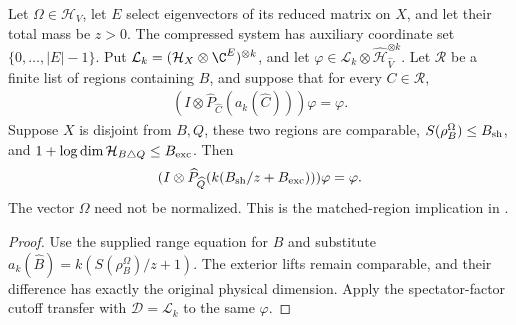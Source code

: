 \begin{theorem}
    \label{thm:compressed_physical_matched_cutoff}
    \leanok
    Let $\Omega\in\mathcal H_V$, let $E$ select eigenvectors of its
    reduced matrix on $X$, and let their total mass be $z>0$.
    The compressed system has auxiliary coordinate set $\{0,\ldots,|E|-1\}$.
    Put $\mathcal L_k=(\mathcal H_X\otimes\C^E)^{\otimes k}$, and let
    $\varphi\in\mathcal L_k\otimes\widehat{\mathcal H}_{\widehat V}^{\otimes k}$.
    Let $\mathcal R$ be a finite list of regions containing $B$, and suppose
    that for every $C\in\mathcal R$,
    \begin{align*}
        (I\otimes\widehat P_{\widehat C}(a_k(\widehat C)))\varphi=\varphi.
    \end{align*}
    Suppose $X$ is disjoint from $B,Q$, these two regions are comparable,
    $S(\rho_B^\Omega)\leq B_{\rm sh}$, and
    $1+\log\dim\mathcal H_{B\triangle Q}\leq B_{\rm exc}$.
    Then
    \begin{align*}
        (I\otimes\widehat P_{\widehat Q}(k(B_{\rm sh}/z+B_{\rm exc})))\varphi=\varphi.
    \end{align*}
    The vector $\Omega$ need not be normalized. This is the matched-region
    implication in \cite[Section~8, lines~332--365]{OpenAI2026AreaLaw}.
\end{theorem}
\begin{proof}\leanok
    Use the supplied range equation for $B$ and substitute
    $a_k(\widehat B)=k(S(\rho_B^\Omega)/z+1)$.
    The exterior lifts remain comparable, and their difference has
    exactly the original physical dimension. Apply the spectator-factor
    cutoff transfer with $\mathcal D=\mathcal L_k$ to the same $\varphi$.
\end{proof}
